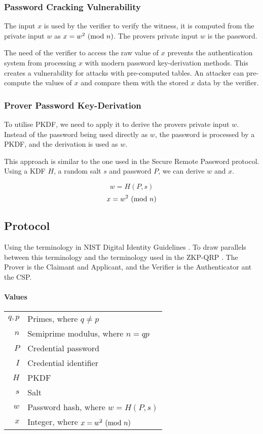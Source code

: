 \subsubsection{Password Cracking Vulnerability}

The input $x$ is used by the verifier to verify the witness, it is computed from the private input $w$ as $x = w^2 \ (\mathrm{mod}\ n)$.
The provers private input $w$ is the password.

The need of the verifier to access the raw value of $x$ prevents the authentication system from processing $x$ with modern password key-derivation methods.
This creates a vulnerability for attacks with pre-computed tables.
An attacker can pre-compute the values of $x$ and compare them with the stored $x$ data by the verifier.

\subsubsection{Prover Password Key-Derivation}
To utilise PKDF, we need to apply it to derive the provers private input $w$.
Instead of the password being used directly as $w$, the password is processed by a PKDF, and the derivation is used as $w$.

This approach is similar to the one used in \cite{wu1998secure} the Secure Remote Password protocol.
Using a KDF $H$, a random salt $s$ and password $P$, we can derive $w$ and $x$.

$$w = H(P, s)$$
$$x = w^2 \ (\mathrm{mod}\ n)$$

\subsection{Protocol} %
Using the terminology in NIST Digital Identity Guidelines \cite{grassi2017}. %
To draw parallels between this terminology and the terminology used in the ZKP-QRP \cite{GMR}. The Prover is the Claimant and Applicant, and the Verifier is the Authenticator ant the CSP.

\paragraph{Values}
\begin{center}
	\begin{tabular}{rl} %
		$q, p$ & Primes, where $q \ne p$\\
		$n$ & Semiprime modulus, where $n = qp$\\
		$P$ & Credential password \\
		$I$ & Credential identifier \\
		$H$ & PKDF \\
		$s$	& Salt\\
		$w$ & Password hash, where $w = H(P, s)$\\ %
		$x$ & Integer, where $x = w^2 \ (\mathrm{mod}\ n)$ %
	\end{tabular}
\end{center}


